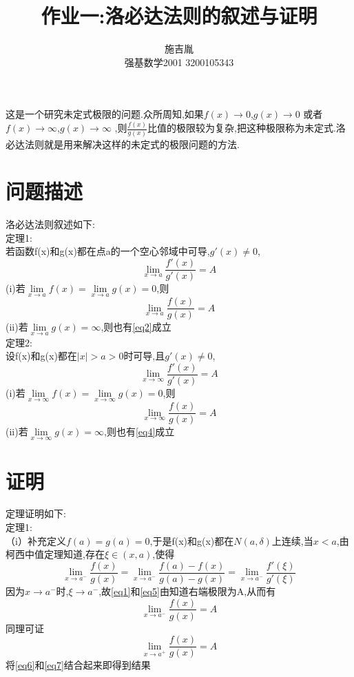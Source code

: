 \documentclass{ctexart}
\title{作业一:洛必达法则的叙述与证明}
\author{施吉胤 \\ 强基数学2001 3200105343}
\begin{document}
\maketitle
这是一个研究未定式极限的问题.众所周知,如果$f(x) \to 0$,$g(x) \to 0$ 或者$f(x)\rightarrow \infty$,$g(x)\rightarrow \infty$ ,则$\frac{f(x)}{g(x)}$比值的极限较为复杂,把这种极限称为未定式.洛必达法则就是用来解决这样的未定式的极限问题的方法.

\section{问题描述}
洛必达法则叙述如下:\\
定理1:\\
若函数f(x)和g(x)都在点a的一个空心邻域中可导,$g'(x)\neq 0$,
\begin{equation}
  \lim\limits_{x \to a}\frac{f'(x)}{g'(x)}=A\label{eq1}
\end{equation}
(i)若$\lim\limits_{x \to a}f(x)=\lim\limits_{x \to a}g(x)=0$,则
\begin{equation}
  \lim\limits_{x \to a}\frac{f(x)}{g(x)}=A\label{eq2}
  \end{equation}
(ii)若$\lim\limits_{x \to a}g(x)= \infty$,则也有\eqref{eq2}成立\\
定理2:\\
设f(x)和g(x)都在$|x|>a>0$时可导,且$g'(x) \neq 0$,
\begin{equation}
  \lim\limits_{x \to \infty}\frac{f'(x)}{g'(x)}=A\label{eq3}
  \end{equation}
(i)若$\lim\limits_{x \to \infty}f(x)=\lim\limits_{x \to \infty}g(x)=0$,则
\begin{equation}
  \lim\limits_{x \to \infty}\frac{f(x)}{g(x)}=A\label{eq4}
  \end{equation}
(ii)若$\lim\limits_{x \to \infty}g(x)= \infty$,则也有\eqref{eq4}成立\\

\section{证明}
定理证明如下:\\
定理1:\\
（i）补充定义$f(a)=g(a)=0$,于是f(x)和g(x)都在$N(a,\delta)$上连续,当$x<a$,由柯西中值定理知道,存在$\xi \in (x,a)$,使得
\begin{equation}
  \lim\limits_{x \to a^-}\frac{f(x)}{g(x)}=\lim\limits_{x \to a^-}\frac{f(a)-f(x)}{g(a)-g(x)}=\lim\limits_{x \to a^-}\frac{f'(\xi)}{g'(\xi)}\label{eq5}
  \end{equation}
因为$x \to a^-$时,$\xi \to a^-$,故\eqref{eq1}和\eqref{eq5}由知道右端极限为A,从而有
\begin{equation}
  \lim\limits_{x \to a^-}\frac{f(x)}{g(x)}=A\label{eq6}
  \end{equation}
同理可证
\begin{equation}
  \lim\limits_{x \to a^+}\frac{f(x)}{g(x)}=A\label{eq7}
\end{equation}
将\eqref{eq6}和\eqref{eq7}结合起来即得到结果\\
\end{document}
